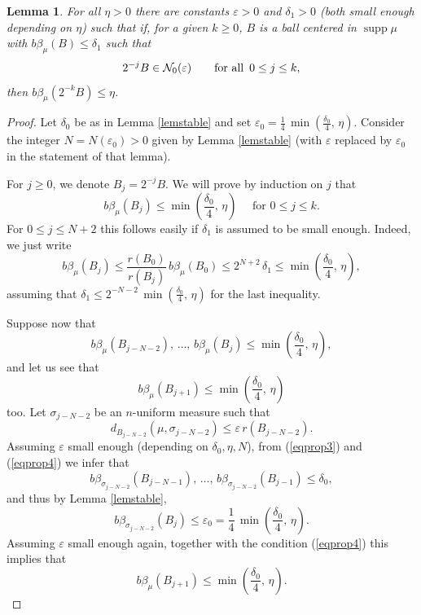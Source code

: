 \documentclass[11pt]{amsart}
\newcommand{\NN}{{\mathcal N}}
\newcommand{\rf}[1]{{(\ref{#1})}}
\newcommand{\supp}{\operatorname{supp}}
\newcommand{\ve}{{\varepsilon}}
\newcommand{\vv}{{\vspace{2mm}}}
\newtheorem{lemma}[theorem]{Lemma}
\theoremstyle{definition}
\theoremstyle{remark}
\numberwithin{equation}{section}
\begin{document}
\vv

\begin{lemma}\label{lem10}
For all $\eta>0$ there are constants $\ve>0$ and $\delta_1>0$ (both small enough depending on $\eta$) such that if, for a given $k\geq0$, $B$ is a ball centered in  $\supp\mu$ with $b\beta_\mu(B)\leq \delta_1$ such that 
$$2^{-j}B\in\NN_0(\ve)\qquad\mbox{for all\, $0\leq j\leq k$},$$
then $b\beta_\mu(2^{-k}B)\leq \eta$.
\end{lemma}


\begin{proof} 
Let $\delta_0$ be as in Lemma \ref{lemstable} and set
$\ve_0=\frac14\,\min\left(\frac{\delta_0}{4},\,\eta\right)$. Consider the integer $N=N(\ve_0)>0$
given by Lemma \ref{lemstable} (with $\ve$ replaced by $\ve_0$ in the statement of that lemma).

For $j\geq0$, we denote $B_j=2^{-j}B$. We will prove by induction on $j$ that 
$$b\beta_\mu(B_j)\leq \min\left(\frac{\delta_0}4,\,\eta\right)\quad\mbox{ for $0\leq j\leq k$.}$$
For $0\leq j \leq N+2$ this follows easily if $\delta_1$ is assumed to be small enough. Indeed,
we just write
$$b\beta_\mu(B_j)\leq \frac{r(B_0)}{r(B_j)}\, b\beta_\mu(B_0)\leq 2^{N+2}\,\delta_1
\leq \min\left(\frac{\delta_0}4,\,\eta\right),$$
assuming that $\delta_1\leq  2^{-N-2}\,\min\left(\frac{\delta_0}4,\,\eta\right)$ for the last inequality.

Suppose now that 
\begin{equation}\label{eqprop3}
b\beta_\mu(B_{j-N-2}),\,\ldots,\,b\beta_\mu(B_j)\leq \min\left(\frac{\delta_0}4,\,\eta\right),
\end{equation}
and let us see that $$b\beta_\mu(B_{j+1})\leq\min\left(\frac{\delta_0}4,\,\eta\right)$$ too.
Let $\sigma_{j-N-2}$ be an $n$-uniform measure such that 
\begin{equation}\label{eqprop4}
d_{B_{j-N-2}}(\mu,\sigma_{j-N-2})\leq \ve\,r(B_{j-N-2}).
\end{equation}
Assuming $\ve$ small enough (depending on $\delta_0,\eta,N$), from \rf{eqprop3} and \rf{eqprop4} we infer that
$$b\beta_{\sigma_{j-N-2}}(B_{j-N-1}),\,\ldots,\,b\beta_{\sigma_{j-N-2}}(B_{j-1})\leq \delta_0,$$
and thus by Lemma \ref{lemstable}, 
$$b\beta_{\sigma_{j-N-2}}(B_{j})\leq \ve_0=\frac14\,\min\left(\frac{\delta_0}{4},\,\eta\right).$$
Assuming $\ve$ small enough again, together with the condition \rf{eqprop4} this implies that
$$b\beta_\mu(B_{j+1})\leq \min\left(\frac{\delta_0}4,\,\eta\right).$$
\end{proof}
\vv
\end{document}
